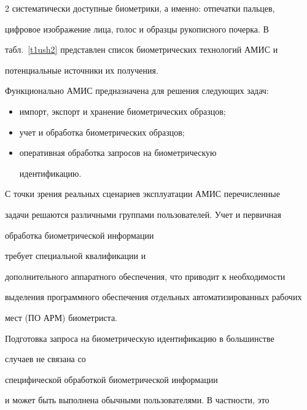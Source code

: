 \begin{multicols}{2}
систематически доступные биометрики, а именно: отпечатки пальцев, 

цифровое изображение лица, голос и образцы рукописного почерка. В 

табл.~\ref{t1ush2} представлен список биометрических технологий АМИС и 

потенциальные источники их получения.

  

  

  Функционально АМИС предназначена для решения следующих задач:

  \begin{itemize}

\item импорт, экспорт и хранение биометрических образцов;\\[-13pt]

\item учет и обработка биометрических образцов;\\[-13pt]

\item оперативная обработка запросов на биометрическую 

идентификацию.\\[-13pt]

\end{itemize}

  

  С точки зрения реальных сценариев эксплуатации АМИС перечисленные 

задачи решаются различ\-ны\-ми группами пользователей. Учет и первичная 

обработка биометрической информации %

требует специальной квалификации и 

дополнительного аппаратного обеспечения, что приводит к необходимости 

выделения программного обеспечения отдельных автоматизированных рабочих 

мест (ПО АРМ) биометриста. 

  

  Подготовка запроса на биометрическую иден\-ти\-фи\-ка\-цию в большинстве 

случаев не связана со %

специ\-фи\-че\-ской обработкой биометрической информации 

и может быть выполнена обычными пользователями. В частности, это 


\end{multicols}

